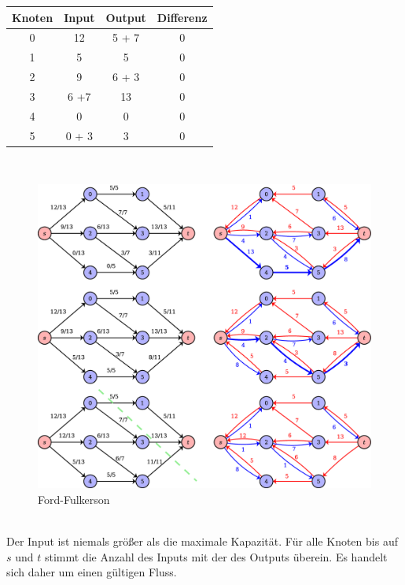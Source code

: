 \documentclass[a4paper,11pt,twoside]{scrartcl}
\begin{document}
\begin{center}
	{\scriptsize\vspace{-20pt}
  \begin{tabular}{| c || c | c | c |}
    \hline
    Knoten & Input & Output & Differenz\\ \hline
    0 & 12     & 5 + 7 & 0 \\ \hline
    1 & 5       & 5       & 0 \\ \hline
    2 &  9      & 6 + 3 & 0 \\ \hline
    3 & 6 +7  & 13     & 0 \\ \hline
    4 & 0       & 0       & 0 \\ \hline
    5 & 0 + 3 & 3       & 0 \\ \hline
  \end{tabular}
}
\end{center}

$ $\\

\begin{figure}
	\centering
	\includegraphics[width=0.9\linewidth]{Grafik/Diagramm1}
	\caption{Ford-Fulkerson}
	\label{fig:Ford-Fulkerson}
	\vspace*{-120pt}
\end{figure}

$ $\\

Der Input ist niemals größer als die maximale Kapazität. Für alle Knoten bis auf $s$ und $t$ stimmt die Anzahl des Inputs mit der des Outputs  überein. Es handelt sich daher um einen gültigen Fluss.
\end{document}
